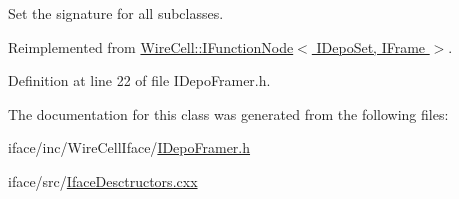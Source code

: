 Set the signature for all subclasses. 



Reimplemented from \hyperlink{class_wire_cell_1_1_i_function_node_af59f46cf19ca9fdf4aade1f289feedf2}{Wire\+Cell\+::\+I\+Function\+Node$<$ I\+Depo\+Set, I\+Frame $>$}.



Definition at line 22 of file I\+Depo\+Framer.\+h.



The documentation for this class was generated from the following files\+:\begin{DoxyCompactItemize}
\item 
iface/inc/\+Wire\+Cell\+Iface/\hyperlink{_i_depo_framer_8h}{I\+Depo\+Framer.\+h}\item 
iface/src/\hyperlink{_iface_desctructors_8cxx}{Iface\+Desctructors.\+cxx}\end{DoxyCompactItemize}
